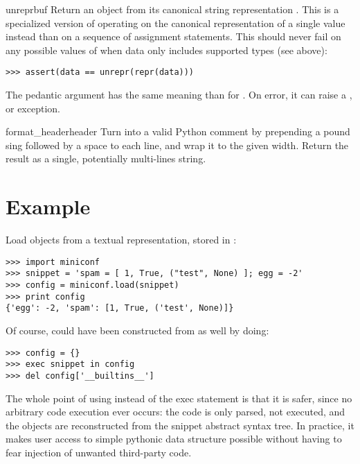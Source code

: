 \documentclass{howto}
\begin{document}
\begin{funcdesc}{unrepr}{buf}
Return an object from its canonical string representation . This is a
specialized version of  operating on the canonical representation
of a single value instead than on a sequence of assignment statements. This
should never fail on any possible values of  when data only includes
supported types (see above):

\begin{verbatim}
>>> assert(data == unrepr(repr(data)))
\end{verbatim}

The pedantic argument has the same meaning than for . On error,
it can raise a ,  or
 exception.
\end{funcdesc}

\begin{funcdesc}{format_header}{header}
Turn  into a valid Python comment by prepending a pound sing
followed by a space to each line, and wrap it to the given width. Return the
result as a single, potentially multi-lines string.
\end{funcdesc}

\section{Example}

Load objects from a textual representation, stored in :

\begin{verbatim}
>>> import miniconf
>>> snippet = 'spam = [ 1, True, ("test", None) ]; egg = -2'
>>> config = miniconf.load(snippet)
>>> print config
{'egg': -2, 'spam': [1, True, ('test', None)]}
\end{verbatim}

Of course,  could have been constructed from  as well
by doing:

\begin{verbatim}
>>> config = {}
>>> exec snippet in config
>>> del config['__builtins__']
\end{verbatim}

The whole point of using  instead of the exec statement is that
it is safer, since no arbitrary code execution ever occurs: the code is only
parsed, not executed, and the objects are reconstructed from the snippet
abstract syntax tree. In practice, it makes user access to simple pythonic data
structure possible without having to fear injection of unwanted third-party
code.
\end{document}
